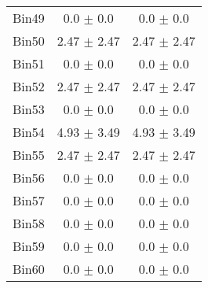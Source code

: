 \begin{tabular}{|c|c|c|}
     Bin49 & 0.0 $\pm$ 0.0 & 0.0 $\pm$ 0.0 \\ \cline{1-3} 
     Bin50 & 2.47 $\pm$ 2.47 & 2.47 $\pm$ 2.47 \\ \cline{1-3} 
     Bin51 & 0.0 $\pm$ 0.0 & 0.0 $\pm$ 0.0 \\ \cline{1-3} 
     Bin52 & 2.47 $\pm$ 2.47 & 2.47 $\pm$ 2.47 \\ \cline{1-3} 
     Bin53 & 0.0 $\pm$ 0.0 & 0.0 $\pm$ 0.0 \\ \cline{1-3} 
     Bin54 & 4.93 $\pm$ 3.49 & 4.93 $\pm$ 3.49 \\ \cline{1-3} 
     Bin55 & 2.47 $\pm$ 2.47 & 2.47 $\pm$ 2.47 \\ \cline{1-3} 
     Bin56 & 0.0 $\pm$ 0.0 & 0.0 $\pm$ 0.0 \\ \cline{1-3} 
     Bin57 & 0.0 $\pm$ 0.0 & 0.0 $\pm$ 0.0 \\ \cline{1-3} 
     Bin58 & 0.0 $\pm$ 0.0 & 0.0 $\pm$ 0.0 \\ \cline{1-3} 
     Bin59 & 0.0 $\pm$ 0.0 & 0.0 $\pm$ 0.0 \\ \cline{1-3} 
     Bin60 & 0.0 $\pm$ 0.0 & 0.0 $\pm$ 0.0 \\ \cline{1-3} 
  \end{tabular}
